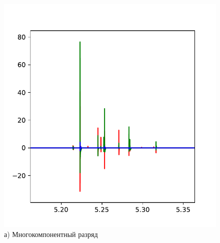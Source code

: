 \documentclass[a4paper,14pt]{extarticle}
\begin{document}
\begin{figure}[h]
\begin{minipage}[h]{0.49\linewidth}
\centering
\includegraphics[height=1.1\linewidth]{fig/multiple}\\
\hspace{1em}а) Многокомпонентный разряд
\end{minipage}
\hfill
\begin{minipage}[h]{0.49\linewidth}

\end{minipage}
\end{figure}
\end{document}
